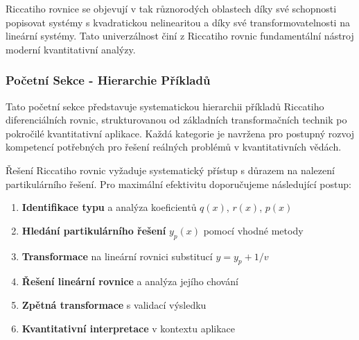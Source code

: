 \vspace{0.8\baselineskip}

\begin{remark}
\label{rem:univerzalnost-riccati}
Riccatiho rovnice se objevují v tak různorodých oblastech díky své schopnosti popisovat 
systémy s kvadratickou nelinearitou a díky své transformovatelnosti na lineární systémy. 
Tato univerzálnost činí z Riccatiho rovnic fundamentální nástroj moderní kvantitativní analýzy.
\end{remark}

\vspace{0.8\baselineskip}

\subsubsection{Početní Sekce - Hierarchie Příkladů}
\label{subsubsec:pocetni-sekce-riccati}

Tato početní sekce představuje systematickou hierarchii příkladů Riccatiho diferenciálních rovnic, strukturovanou od základních transformačních technik po pokročilé kvantitativní aplikace. Každá kategorie je navržena pro postupný rozvoj kompetencí potřebných pro řešení reálných problémů v kvantitativních vědách.

\vspace{0.8\baselineskip}

\begin{intro}
Řešení Riccatiho rovnic vyžaduje systematický přístup s důrazem na nalezení partikulárního řešení. Pro maximální efektivitu doporučujeme následující postup:

\begin{enumerate}
\item \textbf{Identifikace typu} a analýza koeficientů $q(x)$, $r(x)$, $p(x)$
\item \textbf{Hledání partikulárního řešení} $y_p(x)$ pomocí vhodné metody
\item \textbf{Transformace} na lineární rovnici substitucí $y = y_p + 1/v$
\item \textbf{Řešení lineární rovnice} a analýza jejího chování
\item \textbf{Zpětná transformace} s validací výsledku
\item \textbf{Kvantitativní interpretace} v kontextu aplikace
\end{enumerate}
\end{intro}

